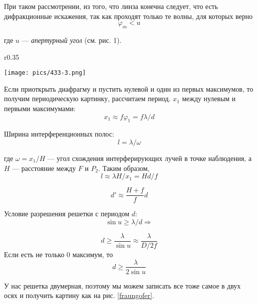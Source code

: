 \documentclass[a4paper,12pt]{article}
\begin{document}
При таком рассмотрении, из того, что линза конечна следует, что есть дифракционные искажения, так как проходят только те волны, для которых верно 
\begin{equation}
\varphi_m < u
\end{equation}

где $u$ --- \textit{апертурный угол} (см. рис. 1).

\begin{wrapfigure}{r}{0.35\textwidth}
    \begin{center}
        \texttt{[image: pics/433-3.png]}
    \end{center}
    \caption{Дифракция Фраунгофера на двумерной решетке}\label{fraungofer}
\end{wrapfigure}

Если приоткрыть диафрагму и пустить нулевой и один из первых максимумов, то получим периодическую картинку, рассчитаем период. $x_1$ между нулевым и первыми максимумами:
\begin{equation}
x_1 \approx f \varphi_1 = f \lambda/d
\end{equation} 

Ширина интерференционных полос:
\begin{equation}
l = \lambda/\omega
\end{equation} 

где $\omega = x_1/H$ --- угол схождения интерферирующих лучей в точке наблюдения, а $H$ --- расстояние между $F$ и $P_2$. Таким образом, 
\begin{equation*}
l \approx \lambda H/x_1 = H d/f
\end{equation*}

\begin{equation*}
d' \approx \dfrac{H + f}{f} d
\end{equation*}
	
Условие разрешения решетки с периодом $d$:
\begin{equation*}
\sin u \geqslant \lambda/d \Rightarrow 
\end{equation*}

\begin{equation}
d \geqslant \dfrac{\lambda}{\sin u} \approx \dfrac{\lambda}{D/2f}
\end{equation}
Если есть не только 0 максимум, то 
\begin{equation}
d \geqslant \dfrac{\lambda}{2 \sin u}
\end{equation}

У нас решетка двумерная, поэтому мы можем записать все тоже самое в двух осях и получить картину как на рис. \ref{fraungofer}.
\end{document}
